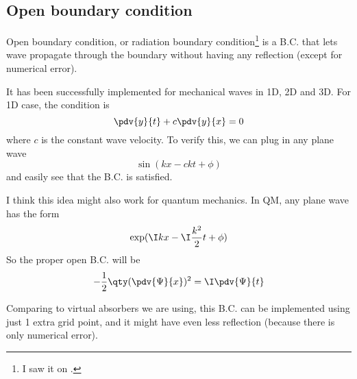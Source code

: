 
\subsection{Open boundary condition}

Open boundary condition, or radiation boundary condition\footnote{I saw it on .} is a B.C. that lets wave propagate through the boundary without having any reflection (except for numerical error).

It has been successfully implemented for mechanical waves in 1D, 2D and 3D. For 1D case, the condition is
\begin{equation}
\pdv{y}{t} + c\pdv{y}{x} = 0
\end{equation}
where $c$ is the constant wave velocity. To verify this, we can plug in any plane wave
\begin{equation}
\sin(kx - ckt + \phi)
\end{equation}
and easily see that the B.C. is satisfied.

I think this idea might also work for quantum mechanics. In QM, any plane wave has the form
\begin{equation}
\exp(\I kx - \I \frac{k^2}{2}t + \phi)
\end{equation}
So the proper open B.C. will be
\begin{equation}
-\frac12 \qty(\pdv{\Psi}{x})^2 = \I \pdv{\Psi}{t}
\end{equation}

Comparing to virtual absorbers we are using, this B.C. can be implemented using just 1 extra grid point, and it might have even less reflection (because there is only numerical error).

